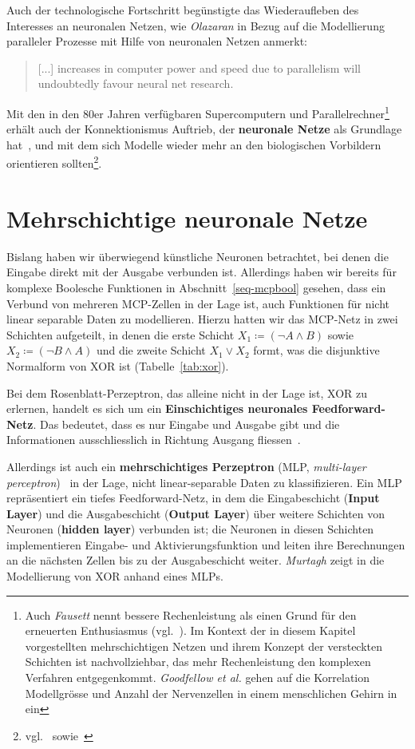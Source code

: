Auch der technologische Fortschritt begünstigte das Wiederaufleben des Interesses an neuronalen Netzen, wie \textit{Olazaran} in Bezug auf die Modellierung paralleler Prozesse mit Hilfe von neuronalen Netzen anmerkt:

\blockquote[{\cite[644]{Ola96}}]{
    [...] increases in computer power and speed due to parallelism will undoubtedly favour neural net research.
}

Mit den in den 80er Jahren verfügbaren Supercomputern und Parallelrechner\footnote{
    Auch \textit{Fausett} nennt bessere Rechenleistung als einen Grund für den erneuerten Enthusiasmus (vgl.~\cite[26]{Fau94}). Im Kontext der in diesem Kapitel vorgestellten mehrschichtigen Netzen und ihrem Konzept der versteckten Schichten ist nachvollziehbar, das mehr Rechenleistung den komplexen Verfahren entgegenkommt. \textit{Goodfellow et al.} gehen auf die Korrelation Modellgrösse und Anzahl der Nervenzellen in einem menschlichen Gehirn in~\cite[24 f.]{GBC18} ein
} erhält auch der Konnektionismus Auftrieb, der \textbf{neuronale Netze} als Grundlage hat~\cite[15]{Dor91}, und mit dem sich Modelle wieder mehr an den biologischen Vorbildern orientieren sollten\footnote{
    vgl.~\cite[43]{RM87} sowie~\cite[18 f.]{GBC18}}.


\section{Mehrschichtige neuronale Netze}

Bislang haben wir überwiegend künstliche Neuronen betrachtet, bei denen die Eingabe direkt mit der Ausgabe verbunden ist. Allerdings haben wir bereits für komplexe Boolesche Funktionen in Abschnitt~\ref{seq-mcpbool} gesehen, dass ein Verbund von mehreren MCP-Zellen in der Lage ist, auch Funktionen für nicht linear separable Daten zu modellieren. Hierzu hatten wir das MCP-Netz in zwei Schichten aufgeteilt, in denen die erste Schicht $X_1 \coloneqq (\neg A \land B)$ sowie $X_2 \coloneqq (\neg B \land A)$ und die zweite Schicht $X_1 \lor X_2$ formt, was die disjunktive Normalform von XOR ist (Tabelle~\ref{tab:xor}).

Bei dem Rosenblatt-Perzeptron, das alleine nicht in der Lage ist, XOR zu erlernen, handelt es sich um ein \textbf{Einschichtiges neuronales Feedforward-Netz}.
Das bedeutet, dass es nur Eingabe und Ausgabe gibt und die Informationen ausschliesslich in Richtung Ausgang fliessen~\cite[848]{RN09}.

Allerdings ist auch ein \textbf{mehrschichtiges Perzeptron} (MLP, \textit{multi-layer perceptron})~\cite[6]{GBC18} in der Lage, nicht linear-separable Daten zu klassifizieren.
Ein MLP repräsentiert ein tiefes Feedforward-Netz, in dem die Eingabeschicht (\textbf{Input Layer}) und die Ausgabeschicht (\textbf{Output Layer}) über weitere Schichten von Neuronen (\textbf{hidden layer}) verbunden ist; die Neuronen in diesen Schichten implementieren Eingabe- und Aktivierungsfunktion und leiten ihre Berechnungen an die nächsten Zellen bis zu der Ausgabeschicht weiter. \textit{Murtagh} zeigt in \cite[184 f.]{Mur91} die Modellierung von XOR anhand eines MLPs.

